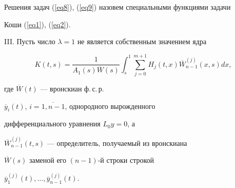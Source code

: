 Решения задач (\ref{eq8}), (\ref{eq9}) назовем специальными функциями задачи 


Коши (\ref{eq1}), (\ref{eq2}).





III. Пусть число $\lambda = 1$ не является собственным значением ядра


\begin{equation}


\label{eq10}


K(t,s)=\frac{1}{A_{1}(s)\overline{W}(s)}\int_{s}^{1} 


\sum_{j=0}^{m+1}H_{j}(t,x)\overline{W}_{n-1}^{(j)}(x,s)dx,


\end{equation}


где $\overline{W}(t)$ --- вронскиан ф.\,с.\,р. 


$\overline{y}_{i}(t)$, $i=\overline{1,n-1}$, однородного вырожденного 


дифференциального уравнения $L_{0}y=0$, а 


$\overline{W}_{n-1}^{(j)}(t,s)$ --- определитель, получаемый из вронскиана 


$\overline {W}(s)$ заменой его $(n-1)$-й строки строкой 


$\overline{y}_{1}^{(j)}(t), \dotsc, \overline{y}_{n-1}^{(j)}(t)$.





